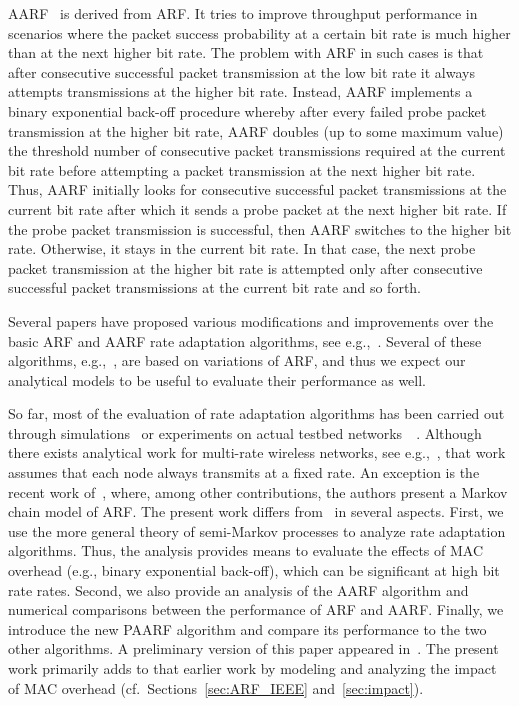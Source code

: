 \documentclass[11pt, journal, letterpaper, oneside, onecolumn]{IEEEtran}
\begin{document}
AARF~\cite{AARF} is derived from ARF. It tries to improve
throughput performance in scenarios where the packet success
probability at a certain bit rate is much higher than at the next
higher bit rate. The problem with ARF in such cases is that after
 consecutive successful packet transmission at the low bit rate
it always attempts transmissions at the higher bit rate.
Instead, AARF implements a binary exponential back-off procedure
whereby after every failed probe packet transmission at the higher
bit rate, AARF doubles (up to some maximum value) the threshold
number of consecutive packet transmissions required at the current
bit rate before attempting a packet transmission at the next
higher bit rate. Thus, AARF initially looks for  consecutive
successful packet transmissions at the current bit rate after
which it sends a probe packet at the next higher bit rate. If the
probe packet transmission is successful, then AARF switches
 to the higher bit rate. Otherwise, it stays in the
current bit rate. In that case, the next probe packet transmission
at the higher bit rate is attempted only after  consecutive
successful packet transmissions at the current bit rate and so
forth.







Several papers have proposed various modifications and
improvements over the basic ARF and AARF rate adaptation
algorithms, see e.g.,~\cite{Bicket,RRAA,CARA,CARA11,SNR1}. Several
of these algorithms, e.g.,~\cite{CARA,CARA11,SNR1},  are based on
variations of ARF, and thus we expect our analytical models to be
useful to evaluate their performance as well.

So far, most of the evaluation of rate adaptation algorithms has
been carried out through
simulations~\cite{AARF,CARA,AARF_3,AARF_7,AARF_12,SNR1,EACK} or
experiments on actual testbed networks~~\cite{Bicket,RRAA}.
 Although there exists analytical work for multi-rate wireless networks, see
e.g.,~\cite{WLANsingle1,WLANsingle2}, that work assumes that each
node always transmits at a fixed rate.
An exception is the recent work of~\cite{Infocomm}, where, among
other contributions, the authors present a Markov chain model of
ARF. The present work differs from~\cite{Infocomm} in several
aspects. First, we use the more general theory of semi-Markov
processes to analyze rate adaptation algorithms. Thus, the
analysis provides means to evaluate the effects of MAC overhead (e.g., binary exponential back-off),
which can be significant at high bit rate rates.
Second, we also provide an analysis of the AARF algorithm and
numerical comparisons between the performance of ARF and AARF.
Finally, we introduce the new PAARF algorithm and compare its
performance to the two other algorithms. A preliminary version of this paper appeared in~\cite{SECON07}. The present work primarily adds to that earlier work by modeling and analyzing the impact of MAC overhead (cf.~Sections~\ref{sec:ARF_IEEE} and~\ref{sec:impact}).
\end{document}
